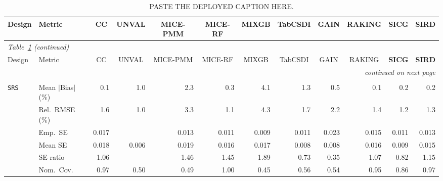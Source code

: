 \begin{landscape}
\footnotesize\setlength{\tabcolsep}{3.5pt}
\begin{longtable}{llrrrrrrrrrr}
\caption{PASTE THE DEPLOYED CAPTION HERE.}
\label{tab:appc_vccc_COX} \\
\toprule
Design & Metric & \multicolumn{1}{c}{CC} & \multicolumn{1}{c}{UNVAL} & \multicolumn{1}{c}{MICE-PMM} & \multicolumn{1}{c}{MICE-RF} & \multicolumn{1}{c}{MIXGB} & \multicolumn{1}{c}{TabCSDI} & \multicolumn{1}{c}{GAIN} & \multicolumn{1}{c}{RAKING} & \multicolumn{1}{c}{\textbf{SICG}} & \multicolumn{1}{c}{\textbf{SIRD}} \\
\midrule \endfirsthead
\multicolumn{12}{l}{\footnotesize\itshape Table~\ref{tab:appc_vccc_COX} (continued)} \\
\toprule
Design & Metric & \multicolumn{1}{c}{CC} & \multicolumn{1}{c}{UNVAL} & \multicolumn{1}{c}{MICE-PMM} & \multicolumn{1}{c}{MICE-RF} & \multicolumn{1}{c}{MIXGB} & \multicolumn{1}{c}{TabCSDI} & \multicolumn{1}{c}{GAIN} & \multicolumn{1}{c}{RAKING} & \multicolumn{1}{c}{\textbf{SICG}} & \multicolumn{1}{c}{\textbf{SIRD}} \\
\midrule \endhead
\midrule \multicolumn{12}{r}{\footnotesize\itshape continued on next page} \\
\endfoot
\bottomrule \endlastfoot
\multicolumn{12}{l}{\textbf{Continuous Phase-Two Covariates}} \\
\addlinespace[2pt]
\quad \texttt{SRS} & Mean $|$Bias$|$ (\%) & \cellcolor{ranktwo}0.1 & 1.0 & 2.3 & 0.3 & 4.1 & 1.3 & 0.5 & \cellcolor{rankone}0.1 & 0.2 & \cellcolor{rankthree}0.2 \\
 & Rel.\ RMSE (\%) & 1.6 & \cellcolor{rankone}1.0 & 3.3 & \cellcolor{ranktwo}1.1 & 4.3 & 1.7 & 2.2 & 1.4 & \cellcolor{rankthree}1.2 & 1.3 \\
 & Emp.\ SE & 0.017 &  & 0.013 & 0.011 & 0.009 & 0.011 & 0.023 & 0.015 & 0.011 & 0.013 \\
 & Mean SE & 0.018 & 0.006 & 0.019 & 0.016 & 0.017 & 0.008 & 0.008 & 0.016 & 0.009 & 0.015 \\
 & SE ratio & \cellcolor{rankone}1.06 &  & 1.46 & 1.45 & 1.89 & 0.73 & 0.35 & \cellcolor{ranktwo}1.07 & 0.82 & \cellcolor{rankthree}1.15 \\
 & Nom.\ Cov. & \cellcolor{ranktwo}0.97 & 0.50 & 0.49 & 1.00 & 0.45 & 0.56 & 0.54 & \cellcolor{rankone}0.95 & 0.86 & \cellcolor{rankthree}0.97 \\

\end{longtable}
\end{landscape}
